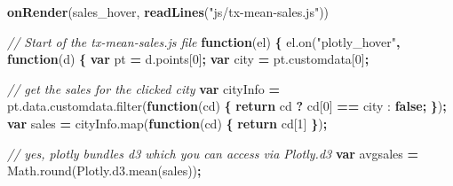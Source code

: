 \documentclass[
  12pt,
]{krantz}
\newenvironment{Shaded}{\begin{snugshade}}{\end{snugshade}}
\newcommand{\AttributeTok}[1]{\textcolor[rgb]{0.77,0.63,0.00}{#1}}
\newcommand{\CommentTok}[1]{\textcolor[rgb]{0.56,0.35,0.01}{\textit{#1}}}
\newcommand{\ControlFlowTok}[1]{\textcolor[rgb]{0.13,0.29,0.53}{\textbf{#1}}}
\newcommand{\DecValTok}[1]{\textcolor[rgb]{0.00,0.00,0.81}{#1}}
\newcommand{\KeywordTok}[1]{\textcolor[rgb]{0.13,0.29,0.53}{\textbf{#1}}}
\newcommand{\NormalTok}[1]{#1}
\newcommand{\OperatorTok}[1]{\textcolor[rgb]{0.81,0.36,0.00}{\textbf{#1}}}
\newcommand{\StringTok}[1]{\textcolor[rgb]{0.31,0.60,0.02}{#1}}
\newcommand{\VariableTok}[1]{\textcolor[rgb]{0.00,0.00,0.00}{#1}}
\begin{document}
\begin{Shaded}
\begin{Highlighting}[]
\KeywordTok{onRender}\NormalTok{(sales_hover, }\KeywordTok{readLines}\NormalTok{(}\StringTok{"js/tx-mean-sales.js"}\NormalTok{))}
\end{Highlighting}
\end{Shaded}

\begin{Shaded}
\begin{Highlighting}[]
\CommentTok{// Start of the tx-mean-sales.js file}
\KeywordTok{function}\NormalTok{(el) }\OperatorTok{\{}
  \VariableTok{el}\NormalTok{.}\AttributeTok{on}\NormalTok{(}\StringTok{"plotly_hover"}\OperatorTok{,} \KeywordTok{function}\NormalTok{(d) }\OperatorTok{\{}
    \KeywordTok{var}\NormalTok{ pt }\OperatorTok{=} \VariableTok{d}\NormalTok{.}\AttributeTok{points}\NormalTok{[}\DecValTok{0}\NormalTok{]}\OperatorTok{;}
    \KeywordTok{var}\NormalTok{ city }\OperatorTok{=} \VariableTok{pt}\NormalTok{.}\AttributeTok{customdata}\NormalTok{[}\DecValTok{0}\NormalTok{]}\OperatorTok{;}

    \CommentTok{// get the sales for the clicked city}
    \KeywordTok{var}\NormalTok{ cityInfo }\OperatorTok{=} \VariableTok{pt}\NormalTok{.}\VariableTok{data}\NormalTok{.}\VariableTok{customdata}\NormalTok{.}\AttributeTok{filter}\NormalTok{(}\KeywordTok{function}\NormalTok{(cd) }\OperatorTok{\{}
      \ControlFlowTok{return}\NormalTok{ cd }\OperatorTok{?}\NormalTok{ cd[}\DecValTok{0}\NormalTok{] }\OperatorTok{==}\NormalTok{ city : }\KeywordTok{false}\OperatorTok{;}
    \OperatorTok{\}}\NormalTok{)}\OperatorTok{;}
    \KeywordTok{var}\NormalTok{ sales }\OperatorTok{=} \VariableTok{cityInfo}\NormalTok{.}\AttributeTok{map}\NormalTok{(}\KeywordTok{function}\NormalTok{(cd) }\OperatorTok{\{} \ControlFlowTok{return}\NormalTok{ cd[}\DecValTok{1}\NormalTok{] }\OperatorTok{\}}\NormalTok{)}\OperatorTok{;}

    \CommentTok{// yes, plotly bundles d3 which you can access via Plotly.d3}
    \KeywordTok{var}\NormalTok{ avgsales }\OperatorTok{=} \VariableTok{Math}\NormalTok{.}\AttributeTok{round}\NormalTok{(}\VariableTok{Plotly}\NormalTok{.}\VariableTok{d3}\NormalTok{.}\AttributeTok{mean}\NormalTok{(sales))}\OperatorTok{;}


\end{Highlighting}
\end{Shaded}
\end{document}
